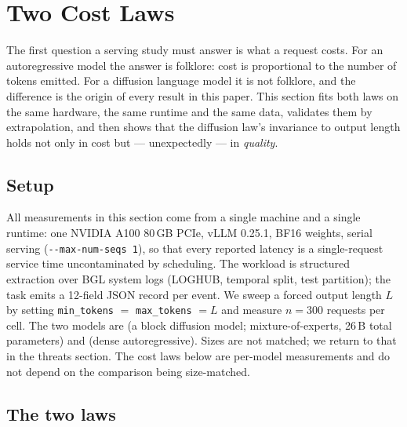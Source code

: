 \section{Two Cost Laws}
\label{sec:cost-laws}

The first question a serving study must answer is what a request costs. For an
autoregressive model the answer is folklore: cost is proportional to the number
of tokens emitted. For a diffusion language model it is not folklore, and the
difference is the origin of every result in this paper. This section fits both
laws on the same hardware, the same runtime and the same data, validates them by
extrapolation, and then shows that the diffusion law's invariance to output
length holds not only in cost but --- unexpectedly --- in \emph{quality}.

\subsection{Setup}
\label{sec:cost-laws:setup}

All measurements in this section come from a single machine and a single
runtime: one NVIDIA A100 80\,GB PCIe, vLLM 0.25.1, BF16 weights, serial serving
(\texttt{-{}-max-num-seqs 1}), so that every reported latency is a
single-request service time uncontaminated by scheduling. The workload is
structured extraction over BGL system logs (LOGHUB, temporal split, test
partition); the task emits a 12-field JSON record per event. We sweep a forced
output length $L$ by setting \texttt{min\_tokens} $=$ \texttt{max\_tokens} $=L$
and measure $n=300$ requests per cell. The two models are \modelDG{} (a block
diffusion model; mixture-of-experts, 26\,B total parameters) and \modelARthree{}
(dense autoregressive). Sizes are not matched; we return to that in the threats
section. The cost laws below are per-model measurements and do not depend on the
comparison being size-matched.

\subsection{The two laws}
\label{sec:cost-laws:laws}


